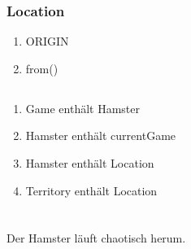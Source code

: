 \documentclass{article}
\begin{document}
            \subsubsection{Location}
                \begin{enumerate}
                    \item{ORIGIN}
                    \item{from()}
                \end{enumerate}
        \subsection{}
                \begin{enumerate}
                    \item{Game enthält Hamster}
                    \item{Hamster enthält currentGame}
                    \item{Hamster enthält Location}
                    \item{Territory enthält Location}
                \end{enumerate}
    \section{}
        \subsection{}
        Der Hamster läuft chaotisch herum.
\end{document}

